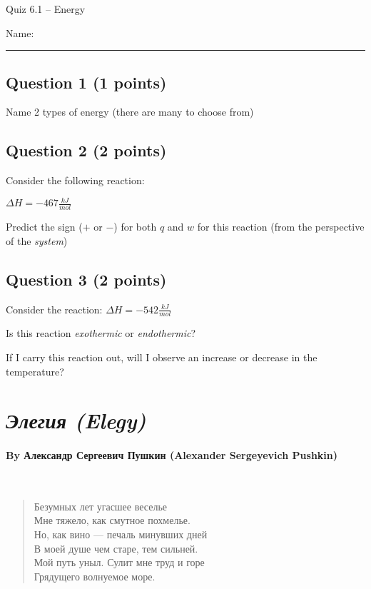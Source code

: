 \documentclass[11pt, letterpaper]{memoir}
\begin{document}
	\begin{center}
		{\large	Quiz 6.1 -- Energy}
	\end{center}
{\large Name: \rule[-1mm]{4in}{.1pt}
	
	\subsection*{Question 1 (1 points)}
	Name 2 types of energy (there are many to choose from)
	
	\vspace{8em}
	\subsection*{Question 2 (2 points)}
	Consider the following reaction:
	
	\noindent
   \hspace{2em} $\Delta H=-467\frac{kJ}{mol}$
	
  \noindent Predict the sign ($+$ or $-$) for both $q$ and $w$ for this reaction (from the perspective of the \emph{system})
	
	\vspace{8em}
	\subsection*{Question 3 (2 points)}
	Consider the reaction:  \hspace{2em} $\Delta H=-542\frac{kJ}{mol}$
	
	\noindent Is this reaction \emph{exothermic} or \emph{endothermic}?
	
	\vspace{6em}
	\noindent If I carry this reaction out, will I observe an increase or decrease in the temperature?

\newpage
\pagestyle{empty}
\addtocounter{page}{-1}
\section*{\emph{Элегия (Elegy)}}
\paragraph{By Александр Сергеевич Пушкин (Alexander Sergeyevich Pushkin)}~
\begin{verse}
	Безумных лет угасшее веселье\\
	Мне тяжело, как смутное похмелье.\\
	Но, как вино — печаль минувших дней\\
	В моей душе чем старе, тем сильней.\\
	Мой путь уныл. Сулит мне труд и горе\\
	Грядущего волнуемое море.


\end{verse}}
\end{document}
